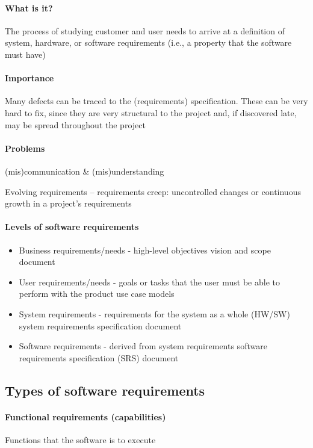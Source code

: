 \documentclass[../ESOF_notes.tex]{subfiles}
\begin{document}
 

\paragraph{What is it?}

The process of studying customer and user needs to arrive at a definition of system, hardware, or software requirements (i.e., a property that the software must have)

\paragraph{Importance} 
Many defects can be traced to the (requirements) specification. These can be very hard to fix, since they are very structural to the project and, if discovered late, may be spread throughout the project

\paragraph{Problems}

(mis)communication \& (mis)understanding

Evolving requirements – requirements creep: uncontrolled changes or continuous growth in a project’s requirements

\paragraph{Levels of software requirements}
\begin{itemize}
    \item Business requirements/needs - high-level objectives
    vision and scope document
    \item User requirements/needs - goals or tasks that the user must be able to perform with the product
    use case models
    \item System requirements - requirements for the system as a whole (HW/SW)
    system requirements specification document
    \item Software requirements - derived from system requirements
    software requirements specification (SRS) document
\end{itemize}

\subsection{Types of software requirements}

\paragraph{Functional requirements (capabilities)} 
Functions that the software is to execute
\end{document}
